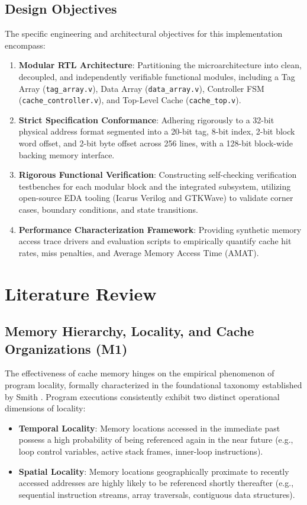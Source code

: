 \documentclass[conference]{IEEEtran}
\begin{document}
\subsection{Design Objectives}
The specific engineering and architectural objectives for this implementation encompass:
\begin{enumerate}
    \item \textbf{Modular RTL Architecture}: Partitioning the microarchitecture into clean, decoupled, and independently verifiable functional modules, including a Tag Array (\texttt{tag\_array.v}), Data Array (\texttt{data\_array.v}), Controller FSM (\texttt{cache\_controller.v}), and Top-Level Cache (\texttt{cache\_top.v}).
    \item \textbf{Strict Specification Conformance}: Adhering rigorously to a 32-bit physical address format segmented into a 20-bit tag, 8-bit index, 2-bit block word offset, and 2-bit byte offset across 256 lines, with a 128-bit block-wide backing memory interface.
    \item \textbf{Rigorous Functional Verification}: Constructing self-checking verification testbenches for each modular block and the integrated subsystem, utilizing open-source EDA tooling (Icarus Verilog and GTKWave) to validate corner cases, boundary conditions, and state transitions.
    \item \textbf{Performance Characterization Framework}: Providing synthetic memory access trace drivers and evaluation scripts to empirically quantify cache hit rates, miss penalties, and Average Memory Access Time (AMAT).
\end{enumerate}

\section{Literature Review}
\subsection{Memory Hierarchy, Locality, and Cache Organizations (M1)}
The effectiveness of cache memory hinges on the empirical phenomenon of program locality, formally characterized in the foundational taxonomy established by Smith \cite{smith1982cache}. Program executions consistently exhibit two distinct operational dimensions of locality:
\begin{itemize}
    \item \textbf{Temporal Locality}: Memory locations accessed in the immediate past possess a high probability of being referenced again in the near future (e.g., loop control variables, active stack frames, inner-loop instructions).
    \item \textbf{Spatial Locality}: Memory locations geographically proximate to recently accessed addresses are highly likely to be referenced shortly thereafter (e.g., sequential instruction streams, array traversals, contiguous data structures).
\end{itemize}
\end{document}
